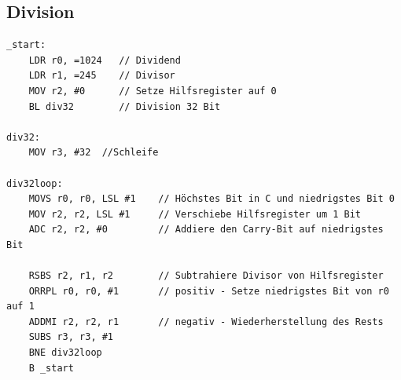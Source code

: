 \documentclass[a4paper, 11pt, onecolumn]{article}
\begin{document}
\subsection{Division}\label{app:benchdiv}
\begin{lstlisting}[basicstyle=\ttfamily\footnotesize, language={[ARM]Assembler}]
_start:
    LDR r0, =1024   // Dividend
    LDR r1, =245    // Divisor
    MOV r2, #0      // Setze Hilfsregister auf 0
    BL div32        // Division 32 Bit

div32:
    MOV r3, #32	 //Schleife

div32loop:
    MOVS r0, r0, LSL #1    // Höchstes Bit in C und niedrigstes Bit 0
    MOV r2, r2, LSL #1	   // Verschiebe Hilfsregister um 1 Bit
    ADC r2, r2, #0         // Addiere den Carry-Bit auf niedrigstes Bit

    RSBS r2, r1, r2        // Subtrahiere Divisor von Hilfsregister
    ORRPL r0, r0, #1	   // positiv - Setze niedrigstes Bit von r0 auf 1
    ADDMI r2, r2, r1	   // negativ - Wiederherstellung des Rests
    SUBS r3, r3, #1		
    BNE div32loop
    B _start
\end{lstlisting}
\end{document}
